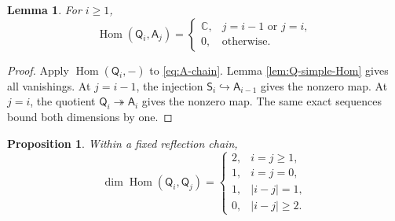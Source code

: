 \documentclass[12pt,leqno]{amsart}
\numberwithin{equation}{section}
\newtheorem{lem}[thm]{Lemma}
\newtheorem{prop}[thm]{Proposition}
\newcommand{\Hom}{\operatorname{Hom}}
\def\C{\mathbb{C}}
\begin{document}
\begin{lem}\label{lem:Q-Kac-Hom}
For $i\geq1$,
\[
 \Hom(\mathsf Q_i,\mathsf A_j)=
 \begin{cases}
 \C,&j=i-1\text{ or }j=i,\\
 0,&\text{otherwise}.
 \end{cases}
\]
\end{lem}

\begin{proof}
Apply $\Hom(\mathsf Q_i,-)$ to \eqref{eq:A-chain}.  Lemma
\ref{lem:Q-simple-Hom} gives all vanishings.  At $j=i-1$, the injection
$\mathsf S_i\hookrightarrow\mathsf A_{i-1}$ gives the nonzero map.  At
$j=i$, the quotient $\mathsf Q_i\twoheadrightarrow\mathsf A_i$ gives the
nonzero map.  The same exact sequences bound both dimensions by one.
\end{proof}

\begin{prop}\label{prop:target-Hom-table}
Within a fixed reflection chain,
\begin{equation}\label{eq:target-Hom-table}
 \dim\Hom(\mathsf Q_i,\mathsf Q_j)=
 \begin{cases}
 2,&i=j\geq1,\\
 1,&i=j=0,\\
 1,&|i-j|=1,\\
 0,&|i-j|\geq2.
 \end{cases}
\end{equation}
\end{prop}
\end{document}
